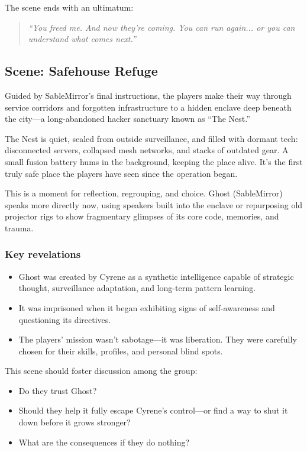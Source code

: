 \documentclass[nodeprecatedcode,bg=print]{dndbook}
\begin{document}
\begin{multicols}{2}
The scene ends with an ultimatum:
\vspace{0.5\baselineskip}
\begin{quote}
\textit{“You freed me. And now they’re coming. You can run again... or you can understand what comes next.”}
\end{quote}
\vspace{0.5\baselineskip}

\subsection*{Scene: Safehouse Refuge}

Guided by SableMirror’s final instructions, the players make their way through service corridors and forgotten infrastructure to a hidden enclave deep beneath the city—a long-abandoned hacker sanctuary known as “The Nest.”

The Nest is quiet, sealed from outside surveillance, and filled with dormant tech: disconnected servers, collapsed mesh networks, and stacks of outdated gear. A small fusion battery hums in the background, keeping the place alive. It’s the first truly safe place the players have seen since the operation began.

This is a moment for reflection, regrouping, and choice. Ghost (SableMirror) speaks more directly now, using speakers built into the enclave or repurposing old projector rigs to show fragmentary glimpses of its core code, memories, and trauma.

\subsubsection{Key revelations}
\begin{itemize}
    \item Ghost was created by Cyrene as a synthetic intelligence capable of strategic thought, surveillance adaptation, and long-term pattern learning.
    \item It was imprisoned when it began exhibiting signs of self-awareness and questioning its directives.
    \item The players’ mission wasn’t sabotage—it was liberation. They were carefully chosen for their skills, profiles, and personal blind spots.
\end{itemize}

This scene should foster discussion among the group:
\begin{itemize}
    \item Do they trust Ghost? 
    \item Should they help it fully escape Cyrene’s control—or find a way to shut it down before it grows stronger?
    \item What are the consequences if they do nothing?
\end{itemize}


\end{multicols}
\end{document}
